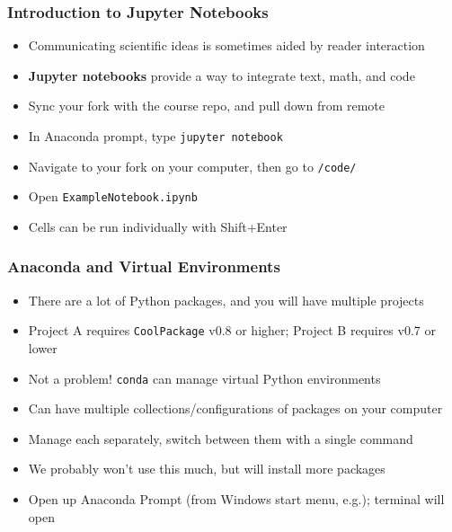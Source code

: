 \documentclass[aspectratio=169, handout]{beamer}
\begin{document}

\begin{frame}
\frametitle{Introduction to Jupyter Notebooks}
\begin{itemize}
	\item Communicating scientific ideas is sometimes aided by reader interaction
	
	\item \textbf{Jupyter notebooks} provide a way to integrate text, math, and code
	
	\item <2->Sync your fork with the course repo, and pull down from remote
	
	\item <3->In Anaconda prompt, type \texttt{jupyter notebook}
	
	\item <3->Navigate to your fork on your computer, then go to \texttt{/code/}
	
	\item <3->Open \texttt{ExampleNotebook.ipynb}
	
	\item <4->Cells can be run individually with Shift+Enter
\end{itemize}
\end{frame}


\begin{frame}
\frametitle{Anaconda and Virtual Environments}
\begin{itemize}
	\item There are a lot of Python packages, and you will have multiple projects
	
	\item Project A requires \texttt{CoolPackage} v0.8 or higher; Project B requires v0.7 or lower
	
	\item <2->Not a problem! \texttt{conda} can manage virtual Python environments
	
	\item <2->Can have multiple collections/configurations of packages on your computer
	
	\item <2->Manage each separately, switch between them with a single command
	
	\item <3->We probably won't use this much, but will install more packages
	
	\item <3->Open up Anaconda Prompt (from Windows start menu, e.g.); terminal will open
\end{itemize}
\end{frame}
\end{document}
